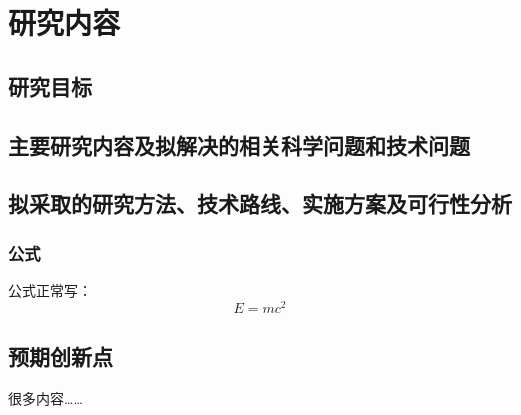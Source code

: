 



\section{研究内容}

\subsection{研究目标}

\subsection{主要研究内容及拟解决的相关科学问题和技术问题}
	
\subsection{拟采取的研究方法、技术路线、实施方案及可行性分析}

\subsubsection{公式}

公式正常写：
\begin{equation}\label{eq:eg:a}
  E=mc^2
\end{equation}

\subsection{预期创新点}

很多内容……



